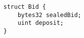 \begin{lstlisting}[language=Solidity]
struct Bid {
	bytes32 sealedBid;
	uint deposit;
}
\end{lstlisting}